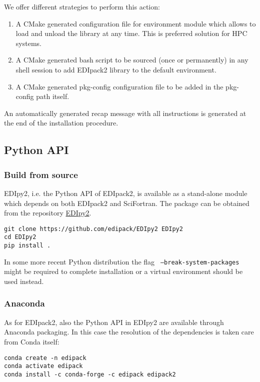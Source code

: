 \documentclass[final,3p,10pt]{elsarticle}
\def\NAME{{\rm EDIpack2 }}
\begin{document}
We offer different strategies to perform this action:
\begin{enumerate}
\item  A CMake generated configuration file for environment module
  which allows to load and unload the library at any time. This is
  preferred solution for HPC systems. 
\item A CMake generated bash script to be sourced (once or
  permanently) in any shell session to add \NAME library to the
  default environment.
\item A CMake generated pkg-config configuration file to be added in
  the pkg-config path itself.  
\end{enumerate}
An automatically generated recap message with all instructions is
generated at the end of the installation procedure. 



\subsection{Python API}
\subsubsection{Build from source}
EDIpy2, i.e. the Python API of EDIpack2, is available as a stand-alone
module which depends on both \NAME and SciFortran. The package can be
obtained from the repository
\href{https://github.com/EDIpack/EDIpy2.0}{EDIpy2}.

\begin{lstlisting}[style=mybash]
git clone https://github.com/edipack/EDIpy2 EDIpy2
cd EDIpy2
pip install . 
\end{lstlisting}
In some more recent Python distribution the flag {\tt
  --break-system-packages} might be required to complete
installation or a virtual environment should be used instead. 

\subsubsection{Anaconda}
As for EDIpack2, also the Python API in EDIpy2 are available through
Anaconda packaging. In this case the resolution of the dependencies is
taken care from Conda itself:

\begin{lstlisting}[style=mybash]
conda create -n edipack
conda activate edipack
conda install -c conda-forge -c edipack edipack2
\end{lstlisting}
\end{document}
